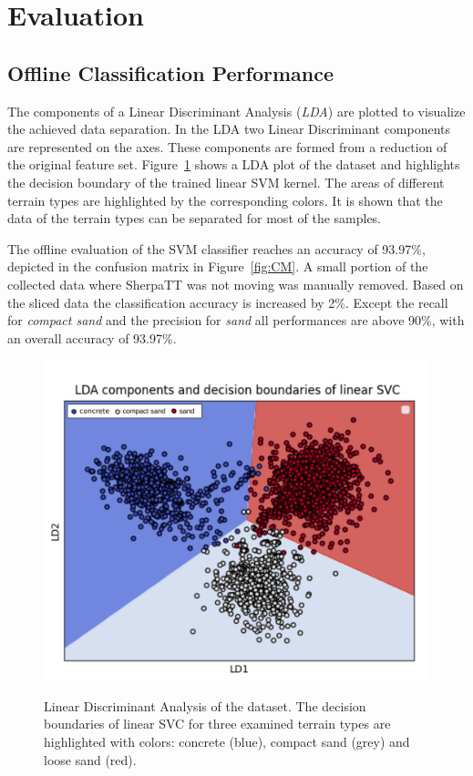 \section{Evaluation}
\subsection{Offline Classification Performance}
The components of a Linear Discriminant Analysis (\emph{LDA}) are plotted to visualize the achieved data separation. 
In the LDA two Linear Discriminant components are represented on the axes. These components are formed from a reduction of the original feature set.
Figure~\ref{fig:LDA} shows a LDA plot of the dataset and highlights the decision boundary of the trained linear SVM kernel. 
The areas of different terrain types are highlighted by the corresponding colors. 
It is shown that the data of the terrain types can be separated for most of the samples.

The offline evaluation of the SVM classifier reaches an accuracy of 93.97\%, depicted in the confusion matrix in Figure~\ref{fig:CM}. 
A small portion of the collected data where SherpaTT was not moving was manually removed. 
Based on the sliced data the classification accuracy is increased by 2\%.
Except the recall for \emph{compact sand} and the precision for \emph{sand} all performances are above 90\%, with an overall accuracy of 93.97\%.


\begin{figure}
    \centering
    {\includegraphics[width=\columnwidth]{../figures/boundary_LDA_prevTesting_all_sand_concrete_compactsand.png}}
    \caption{Linear Discriminant Analysis of the dataset. The decision boundaries of linear SVC for three examined terrain types are highlighted with colors: concrete (blue), compact sand (grey) and loose sand (red).}
    \label{fig:LDA}
\end{figure}

